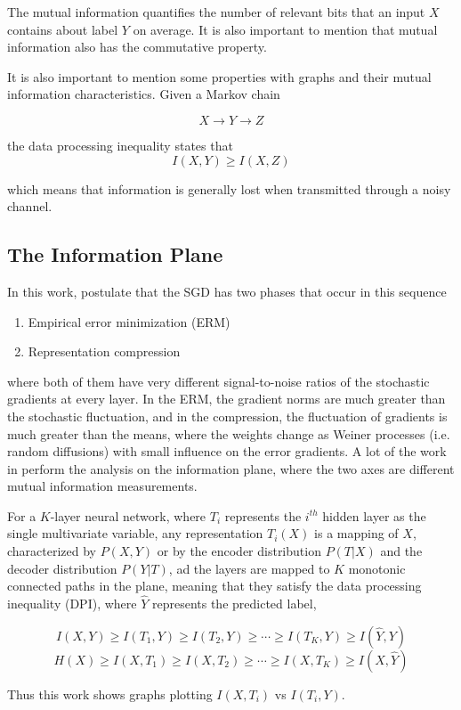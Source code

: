 The mutual information quantifies the number of relevant bits that an input $X$ contains about label $Y$ on average. It is also important to mention that mutual information also has the commutative property.

It is also important to mention some properties with graphs and their mutual information characteristics. Given a Markov chain

$$ X \rightarrow Y \rightarrow Z$$

the data processing inequality states that
$$I(X,Y) \geq I(X,Z)$$

which means that information is generally lost when transmitted through a noisy channel.

\subsection{The Information Plane}
In this work, \cite{blackbox} postulate that the SGD has two phases that occur in this sequence
\begin{enumerate}
    \item Empirical error minimization (ERM)
    \item Representation compression
\end{enumerate}
where both of them have very different signal-to-noise ratios of the stochastic gradients at every layer. In the ERM, the gradient norms are much greater than the stochastic fluctuation, and in the compression, the fluctuation of gradients is much greater than the means, where the weights change as Weiner processes (i.e. random diffusions) with small influence on the error gradients. A lot of the work in \cite{blackbox} perform the analysis on the information plane, where the two axes are different mutual information measurements.

For a $K$-layer neural network, where $T_i$ represents the $i^{th}$ hidden layer as the single multivariate variable, any representation $T_i(X)$ is a mapping of $X$, characterized by $P(X,Y)$ or by the encoder distribution $P(T|X)$ and the decoder distribution $P(Y|T)$, ad the layers are mapped to $K$ monotonic connected paths in the plane, meaning that they satisfy the data processing inequality (DPI), where $\hat{Y}$ represents the predicted label,

$$I(X,Y) \geq I(T_1,Y) \geq I(T_2,Y) \geq \cdots \geq I(T_K,Y) \geq I(\hat{Y},Y)$$
$$H(X)   \geq I(X,T_1) \geq I(X,T_2) \geq \cdots \geq I(X,T_K) \geq I(X,\hat{Y})$$

Thus this work shows graphs plotting $I(X,T_i)$ vs $I(T_i,Y)$.

